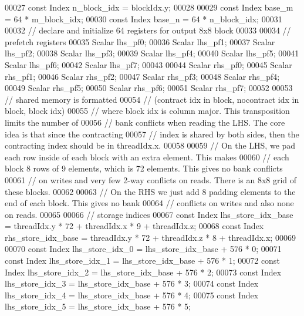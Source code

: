 \begin{DoxyCode}
00027   \textcolor{keyword}{const} Index n\_block\_idx = blockIdx.y;
00028 
00029   \textcolor{keyword}{const} Index base\_m = 64 * m\_block\_idx;
00030   \textcolor{keyword}{const} Index base\_n = 64 * n\_block\_idx;
00031 
00032   \textcolor{comment}{// declare and initialize 64 registers for output 8x8 block}
00033 
00034   \textcolor{comment}{// prefetch registers}
00035   Scalar lhs\_pf0;
00036   Scalar lhs\_pf1;
00037   Scalar lhs\_pf2;
00038   Scalar lhs\_pf3;
00039   Scalar lhs\_pf4;
00040   Scalar lhs\_pf5;
00041   Scalar lhs\_pf6;
00042   Scalar lhs\_pf7;
00043 
00044   Scalar rhs\_pf0;
00045   Scalar rhs\_pf1;
00046   Scalar rhs\_pf2;
00047   Scalar rhs\_pf3;
00048   Scalar rhs\_pf4;
00049   Scalar rhs\_pf5;
00050   Scalar rhs\_pf6;
00051   Scalar rhs\_pf7;
00052 
00053   \textcolor{comment}{// shared memory is formatted}
00054   \textcolor{comment}{// (contract idx in block, nocontract idx in block, block idx)}
00055   \textcolor{comment}{// where block idx is column major. This transposition limits the number of}
00056   \textcolor{comment}{// bank conflicts when reading the LHS. The core idea is that since the contracting}
00057   \textcolor{comment}{// index is shared by both sides, then the contracting index should be in threadIdx.x.}
00058 
00059   \textcolor{comment}{// On the LHS, we pad each row inside of each block with an extra element. This makes}
00060   \textcolor{comment}{// each block 8 rows of 9 elements, which is 72 elements. This gives no bank conflicts}
00061   \textcolor{comment}{// on writes and very few 2-way conflicts on reads. There is an 8x8 grid of these blocks.}
00062 
00063   \textcolor{comment}{// On the RHS we just add 8 padding elements to the end of each block. This gives no bank}
00064   \textcolor{comment}{// conflicts on writes and also none on reads.}
00065 
00066   \textcolor{comment}{// storage indices}
00067   \textcolor{keyword}{const} Index lhs\_store\_idx\_base = threadIdx.y * 72 + threadIdx.x * 9 + threadIdx.z;
00068   \textcolor{keyword}{const} Index rhs\_store\_idx\_base = threadIdx.y * 72 + threadIdx.z * 8 + threadIdx.x;
00069 
00070   \textcolor{keyword}{const} Index lhs\_store\_idx\_0 = lhs\_store\_idx\_base + 576 * 0;
00071   \textcolor{keyword}{const} Index lhs\_store\_idx\_1 = lhs\_store\_idx\_base + 576 * 1;
00072   \textcolor{keyword}{const} Index lhs\_store\_idx\_2 = lhs\_store\_idx\_base + 576 * 2;
00073   \textcolor{keyword}{const} Index lhs\_store\_idx\_3 = lhs\_store\_idx\_base + 576 * 3;
00074   \textcolor{keyword}{const} Index lhs\_store\_idx\_4 = lhs\_store\_idx\_base + 576 * 4;
00075   \textcolor{keyword}{const} Index lhs\_store\_idx\_5 = lhs\_store\_idx\_base + 576 * 5;

\end{DoxyCode}
